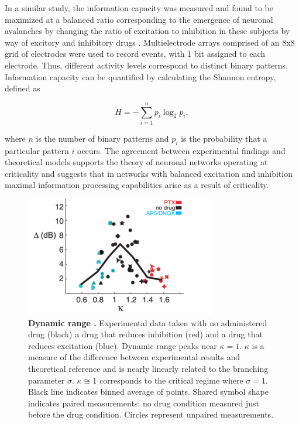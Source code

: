\documentclass[12pt]{article}
\begin{document}
In a similar study, the information capacity was measured and found to be maximized at a balanced ratio corresponding to the emergence of neuronal avalanches by changing the ratio of excitation to inhibition in these subjects by way of excitory and inhibitory drugs \cite{Shew2011a}. Multielectrode arrays comprised of an 8x8 grid of electrodes were used to record events, with 1 bit assigned to each electrode. Thus, different activity levels correspond to distinct binary patterns. Information capacity can be quantified by calculating the Shannon entropy, defined as

\begin{equation}
H = - \sum^{n}_{i=1}p_{i}\log_{2}p_{i},
\end{equation}

\noindent where $n$ is the number of binary patterns and $ p_{i} $ is the probability that a particular pattern $i$ occurs. The agreement between experimental findings and theoretical models supports the theory of neuronal networks operating at criticality and suggests that in networks with balanced excitation and inhibition maximal information processing capabilities arise as a result of criticality. 

\begin{figure}      
  \begin{center}    
 \includegraphics[width=.6\textwidth]{dynamicrangeexpplenz}    
    \caption{\textbf{Dynamic range \cite{Shew2009b}.} Experimental data taken with no administered drug (black) a drug that reduces inhibition (red) and a drug that reduces excitation (blue). Dynamic range peaks near $\kappa = 1$. $\kappa$ is a measure of the difference between experimental results and theoretical reference and is nearly linearly related to the branching parameter $\sigma$. $\kappa \cong 1$ corresponds to the critical regime where $\sigma = 1$. Black line indicates binned average of points. Shared symbol shape indicates paired measurements: no drug condition measured just before the drug condition. Circles represent unpaired measurements.}
    
   \label{Figure::Dynamic Range Experiment}   
  \end{center}     
   \end{figure}
  
\end{document}
